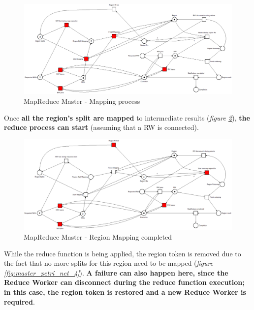 \begin{figure}[!ht]
    \centering
    \includegraphics[width=\linewidth]{document/chapters/chapter_5/images/master_petri_net_2.png}
    \caption{MapReduce Master - Mapping process}
    \label{fig:master_petri_net_2}
\end{figure}

Once \textbf{all the region's split are mapped} to intermediate results (\textit{figure \ref{fig:master_petri_net_3}}), \textbf{the reduce process can start} (assuming that a RW is connected).

\begin{figure}[!ht]
    \centering
    \includegraphics[width=\linewidth]{document/chapters/chapter_5/images/master_petri_net_3.png}
    \caption{MapReduce Master - Region Mapping completed}
    \label{fig:master_petri_net_3}
\end{figure}

While the reduce function is being applied, the region token is removed due to the fact that no more splits for this region need to be mapped (\textit{figure \ref{fig:master_petri_net_4}}). \textbf{A failure can also happen here, since the Reduce Worker can disconnect during the reduce function execution; in this case, the region token is restored and a new Reduce Worker is required}.

\vspace{5mm}

